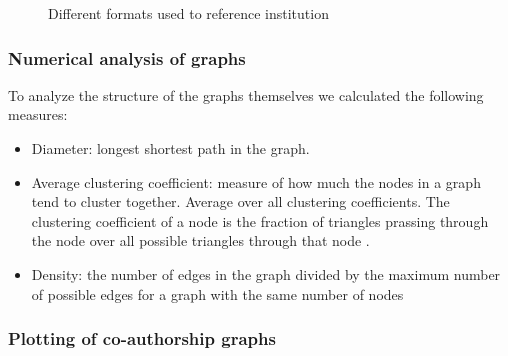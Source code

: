 \documentclass[article,twocolumn]{IEEEtran}
\providecommand{\tightlist}{%
      \setlength{\itemsep}{0pt}\setlength{\parskip}{0pt}}
\begin{document}
    \begin{figure}
        \begin{center}\end{center}
        \caption{Different formats used to reference institution}
        \label{unigraph}
    \end{figure}
    
    \hypertarget{numerical-analysis-of-graphs}{%
\subsubsection{Numerical analysis of
graphs}\label{numerical-analysis-of-graphs}}

To analyze the structure of the graphs themselves we calculated the
following measures:

\begin{itemize}
\tightlist
\item
  Diameter: longest shortest path in the graph.
\item
  Average clustering coefficient: measure of how much the nodes in a
  graph tend to cluster together. Average over all clustering
  coefficients. The clustering coefficient of a node is the fraction of
  triangles prassing through the node over all possible triangles
  through that node \cite{watts1998collective}.
\item
  Density: the number of edges in the graph divided by the maximum
  number of possible edges for a graph with the same number of nodes
\end{itemize}

    \hypertarget{plotting-of-co-authorship-graphs}{%
\subsubsection{Plotting of co-authorship
graphs}\label{plotting-of-co-authorship-graphs}}
\end{document}
